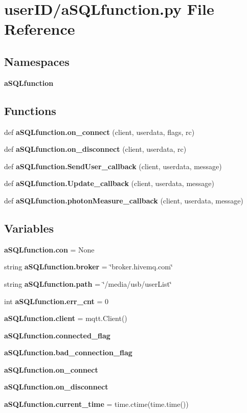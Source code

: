 \section{user\+I\+D/a\+S\+Q\+Lfunction.py File Reference}
\label{a_s_q_lfunction_8py}
\subsection*{Namespaces}
\begin{DoxyCompactItemize}
\item 
 \textbf{ a\+S\+Q\+Lfunction}
\end{DoxyCompactItemize}
\subsection*{Functions}
\begin{DoxyCompactItemize}
\item 
def \textbf{ a\+S\+Q\+Lfunction.\+on\+\_\+connect} (client, userdata, flags, rc)
\item 
def \textbf{ a\+S\+Q\+Lfunction.\+on\+\_\+disconnect} (client, userdata, rc)
\item 
def \textbf{ a\+S\+Q\+Lfunction.\+Send\+User\+\_\+callback} (client, userdata, message)
\item 
def \textbf{ a\+S\+Q\+Lfunction.\+Update\+\_\+callback} (client, userdata, message)
\item 
def \textbf{ a\+S\+Q\+Lfunction.\+photon\+Measure\+\_\+callback} (client, userdata, message)
\end{DoxyCompactItemize}
\subsection*{Variables}
\begin{DoxyCompactItemize}
\item 
\textbf{ a\+S\+Q\+Lfunction.\+con} = None
\item 
string \textbf{ a\+S\+Q\+Lfunction.\+broker} = \char`\"{}broker.\+hivemq.\+com\char`\"{}
\item 
string \textbf{ a\+S\+Q\+Lfunction.\+path} = \char`\"{}/media/usb/user\+List\char`\"{}
\item 
int \textbf{ a\+S\+Q\+Lfunction.\+err\+\_\+cnt} = 0
\item 
\textbf{ a\+S\+Q\+Lfunction.\+client} = mqtt.\+Client()
\item 
\textbf{ a\+S\+Q\+Lfunction.\+connected\+\_\+flag}
\item 
\textbf{ a\+S\+Q\+Lfunction.\+bad\+\_\+connection\+\_\+flag}
\item 
\textbf{ a\+S\+Q\+Lfunction.\+on\+\_\+connect}
\item 
\textbf{ a\+S\+Q\+Lfunction.\+on\+\_\+disconnect}
\item 
\textbf{ a\+S\+Q\+Lfunction.\+current\+\_\+time} = time.\+ctime(time.\+time())
\end{DoxyCompactItemize}
